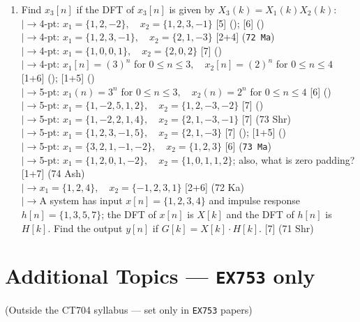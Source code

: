 \documentclass[12pt]{article}
\newcommand{\lb}{\\$\left|\rightarrow\right.$}
\begin{document}
\begin{enumerate}[topsep=0pt, noitemsep]
      \item Find $x_3[n]$ if the DFT of $x_3[n]$ is given by $X_3(k)=X_1(k)X_2(k)$:
        \lb 4-pt: $x_1=\{1,2,-2\},\quad x_2=\{1,2,3,-1\}$ \hfill [5] (); [6] ()
        \lb 4-pt: $x_1=\{1,2,3,-1\},\quad x_2=\{2,1,-3\}$ \hfill [2+4] (\texttt{72 Ma})
        \lb 4-pt: $x_1=\{1,0,0,1\},\quad x_2=\{2,0,2\}$ \hfill [7] ()
        \lb 4-pt: $x_1[n]=(3)^n$ for $0\le n\le3,\quad x_2[n]=(2)^n$ for $0\le n\le4$ \hfill [1+6] (); [1+5] ()
        \lb 5-pt: $x_1(n)=3^n$ for $0\le n\le3,\quad x_2(n)=2^n$ for $0\le n\le4$ \hfill [6] ()
        \lb 5-pt: $x_1=\{1,-2,5,1,2\},\quad x_2=\{1,2,-3,-2\}$ \hfill [7] ()
        \lb 5-pt: $x_1=\{1,-2,2,1,4\},\quad x_2=\{2,1,-3,-1\}$ \hfill [7] (73 Shr)
        \lb 5-pt: $x_1=\{1,2,3,-1,5\},\quad x_2=\{2,1,-3\}$ \hfill [7] (); [1+5] ()
        \lb 5-pt: $x_1=\{3,2,1,-1,-2\},\quad x_2=\{1,2,3\}$ \hfill [6] (\texttt{73 Ma})
        \lb 5-pt: $x_1=\{1,2,0,1,-2\},\quad x_2=\{1,0,1,1,2\}$; also, what is zero padding? \hfill [1+7] (74 Ash)
        \lb $x_1=\{1,2,4\},\quad x_2=\{-1,2,3,1\}$ \hfill [2+6] (72 Ka)
        \lb A system has input $x[n]=\{1,2,3,4\}$ and impulse response $h[n]=\{1,3,5,7\}$; the DFT of $x[n]$ is $X[k]$ and the DFT of $h[n]$ is $H[k]$. Find the output $y[n]$ if $G[k]=X[k]\cdot H[k]$. \hfill [7] (71 Shr)
    \end{enumerate}

\pagebreak
\section{Additional Topics --- \texttt{EX753} only}
\begin{center}(Outside the CT704 syllabus --- set only in \texttt{EX753} papers)\end{center}
\end{document}
